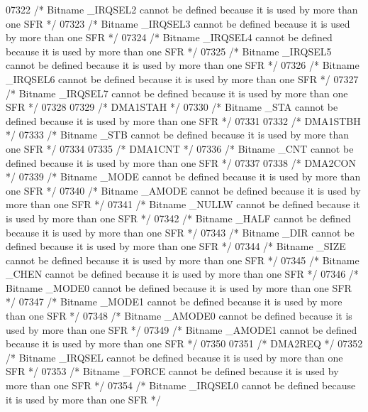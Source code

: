 \begin{DoxyCode}
07322 \textcolor{comment}{/* Bitname \_IRQSEL2 cannot be defined because it is used by more than one SFR */}
07323 \textcolor{comment}{/* Bitname \_IRQSEL3 cannot be defined because it is used by more than one SFR */}
07324 \textcolor{comment}{/* Bitname \_IRQSEL4 cannot be defined because it is used by more than one SFR */}
07325 \textcolor{comment}{/* Bitname \_IRQSEL5 cannot be defined because it is used by more than one SFR */}
07326 \textcolor{comment}{/* Bitname \_IRQSEL6 cannot be defined because it is used by more than one SFR */}
07327 \textcolor{comment}{/* Bitname \_IRQSEL7 cannot be defined because it is used by more than one SFR */}
07328 
07329 \textcolor{comment}{/* DMA1STAH */}
07330 \textcolor{comment}{/* Bitname \_STA cannot be defined because it is used by more than one SFR */}
07331 
07332 \textcolor{comment}{/* DMA1STBH */}
07333 \textcolor{comment}{/* Bitname \_STB cannot be defined because it is used by more than one SFR */}
07334 
07335 \textcolor{comment}{/* DMA1CNT */}
07336 \textcolor{comment}{/* Bitname \_CNT cannot be defined because it is used by more than one SFR */}
07337 
07338 \textcolor{comment}{/* DMA2CON */}
07339 \textcolor{comment}{/* Bitname \_MODE cannot be defined because it is used by more than one SFR */}
07340 \textcolor{comment}{/* Bitname \_AMODE cannot be defined because it is used by more than one SFR */}
07341 \textcolor{comment}{/* Bitname \_NULLW cannot be defined because it is used by more than one SFR */}
07342 \textcolor{comment}{/* Bitname \_HALF cannot be defined because it is used by more than one SFR */}
07343 \textcolor{comment}{/* Bitname \_DIR cannot be defined because it is used by more than one SFR */}
07344 \textcolor{comment}{/* Bitname \_SIZE cannot be defined because it is used by more than one SFR */}
07345 \textcolor{comment}{/* Bitname \_CHEN cannot be defined because it is used by more than one SFR */}
07346 \textcolor{comment}{/* Bitname \_MODE0 cannot be defined because it is used by more than one SFR */}
07347 \textcolor{comment}{/* Bitname \_MODE1 cannot be defined because it is used by more than one SFR */}
07348 \textcolor{comment}{/* Bitname \_AMODE0 cannot be defined because it is used by more than one SFR */}
07349 \textcolor{comment}{/* Bitname \_AMODE1 cannot be defined because it is used by more than one SFR */}
07350 
07351 \textcolor{comment}{/* DMA2REQ */}
07352 \textcolor{comment}{/* Bitname \_IRQSEL cannot be defined because it is used by more than one SFR */}
07353 \textcolor{comment}{/* Bitname \_FORCE cannot be defined because it is used by more than one SFR */}
07354 \textcolor{comment}{/* Bitname \_IRQSEL0 cannot be defined because it is used by more than one SFR */}

\end{DoxyCode}
